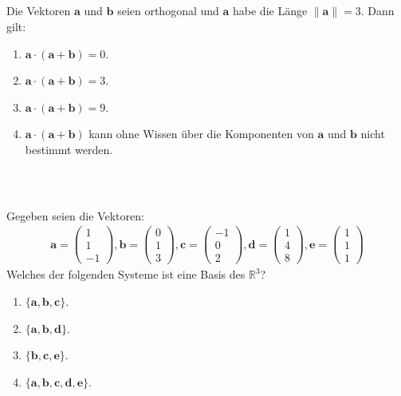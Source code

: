 \subsection*{}
Die Vektoren $ \textbf{a} $ und $ \textbf{b} $ seien orthogonal und $ \textbf{a}  $ habe die Länge $ \| \textbf{a} \| = 3 $.
Dann gilt:
\renewcommand{\labelenumi}{(\alph{enumi})}
\begin{enumerate}
	\item 
	$ \textbf{a} \cdot ( \textbf{a} + \textbf{b}) = 0 $.
	\item
	$ \textbf{a} \cdot ( \textbf{a} + \textbf{b}) = 3 $.
	
	\item
$ \textbf{a} \cdot ( \textbf{a} + \textbf{b}) = 9 $.
	\item
	$ \textbf{a} \cdot ( \textbf{a} + \textbf{b}) $ kann ohne Wissen über die Komponenten von $ \textbf{a} $ und $ \textbf{b} $ nicht bestimmt werden.
\end{enumerate}
\ \\
\subsection*{}
Gegeben seien die Vektoren:
\begin{align*}
\textbf{a}
=
\begin{pmatrix}
1 \\ 1 \\ -1
\end{pmatrix},
\textbf{b}
=
\begin{pmatrix}
0 \\ 1 \\ 3
\end{pmatrix},
\textbf{c}
=
\begin{pmatrix}
-1 \\ 0 \\ 2
\end{pmatrix},
\textbf{d}
=
\begin{pmatrix}
1 \\ 4 \\ 8
\end{pmatrix},
\textbf{e}
=
\begin{pmatrix}
1 \\ 1 \\ 1
\end{pmatrix}
\end{align*}
Welches der folgenden Systeme ist eine Basis des $ \mathbb{R}^3 $?
\renewcommand{\labelenumi}{(\alph{enumi})}
\begin{enumerate}
	\item 
	$ \lbrace \textbf{a}, \textbf{b} , \textbf{c} \rbrace  $.
	\item
	$ \lbrace \textbf{a}, \textbf{b} , \textbf{d} \rbrace  $.
	
	\item
	$ \lbrace \textbf{b}, \textbf{c} , \textbf{e} \rbrace  $.
	\item
$ \lbrace \textbf{a}, \textbf{b} , \textbf{c},\textbf{d}, \textbf{e} \rbrace  $.
\end{enumerate}
\ \\
